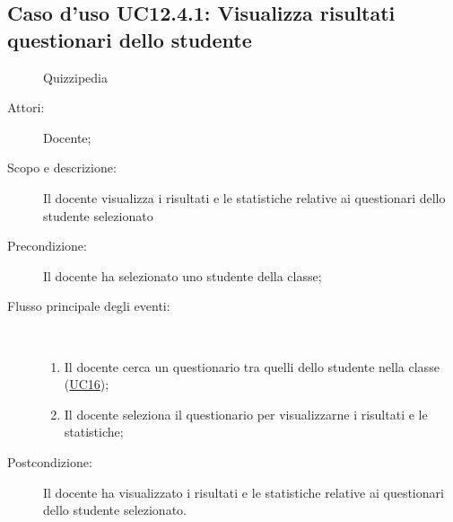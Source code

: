 \subsection{Caso d'uso UC12.4.1: Visualizza risultati questionari dello studente}
	\begin{figure}[H]
		\centering
		\begin{resizedtikzpicture}{\textwidth}
		\begin{umlsystem}[x=0, fill=lightgray!20]{Quizzipedia}
		\end{umlsystem}
		\end{resizedtikzpicture}
		\caption{}
	\end{figure}
\begin{description}
\item[Attori:] Docente;
\item[Scopo e descrizione:] Il docente visualizza i risultati e le statistiche relative ai questionari dello studente selezionato
      \item[Precondizione:] Il docente ha selezionato uno studente della classe;

        \item[Flusso principale degli eventi:] \ 
 \begin{enumerate}
          \item Il docente cerca un questionario tra quelli dello studente nella classe (\hyperlink{UC16}{UC16});
          \item Il docente seleziona il questionario per visualizzarne i risultati e le statistiche;

      \end{enumerate}
    \item[Postcondizione:] Il docente ha visualizzato i risultati e le statistiche relative ai questionari dello studente selezionato.
  \end{description}
\hypertarget{UC13}{}
